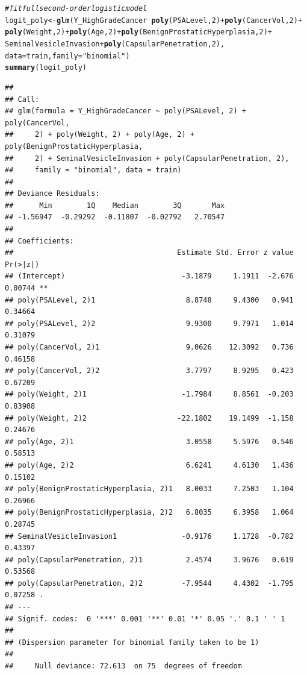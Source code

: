 \documentclass{article}\usepackage[]{graphicx}\usepackage[]{color}
\makeatletter
\newcommand{\hlnum}[1]{\textcolor[rgb]{0.686,0.059,0.569}{#1}}%
\newcommand{\hlstr}[1]{\textcolor[rgb]{0.192,0.494,0.8}{#1}}%
\newcommand{\hlcom}[1]{\textcolor[rgb]{0.678,0.584,0.686}{\textit{#1}}}%
\newcommand{\hlopt}[1]{\textcolor[rgb]{0,0,0}{#1}}%
\newcommand{\hlstd}[1]{\textcolor[rgb]{0.345,0.345,0.345}{#1}}%
\newcommand{\hlkwb}[1]{\textcolor[rgb]{0.69,0.353,0.396}{#1}}%
\newcommand{\hlkwc}[1]{\textcolor[rgb]{0.333,0.667,0.333}{#1}}%
\newcommand{\hlkwd}[1]{\textcolor[rgb]{0.737,0.353,0.396}{\textbf{#1}}}%
\newenvironment{kframe}{%
 \def\at@end@of@kframe{}%
 \ifinner\ifhmode%
  \def\at@end@of@kframe{\end{minipage}}%
  \begin{minipage}{\columnwidth}%
 \fi\fi%
 \def\FrameCommand##1{\hskip\@totalleftmargin \hskip-\fboxsep
 \colorbox{shadecolor}{##1}\hskip-\fboxsep
     \hskip-\linewidth \hskip-\@totalleftmargin \hskip\columnwidth}%
 \MakeFramed {\advance\hsize-\width
   \@totalleftmargin\z@ \linewidth\hsize
   \@setminipage}}%
 {\par\unskip\endMakeFramed%
 \at@end@of@kframe}
\newenvironment{knitrout}{}{} %
\makeatother
\begin{document}
\begin{knitrout}
\begin{kframe}
\begin{alltt}
\hlcom{# fit full second-order logistic model}
\hlstd{logit_poly} \hlkwb{<-} \hlkwd{glm}\hlstd{(Y_HighGradeCancer} \hlopt{~} \hlkwd{poly}\hlstd{(PSALevel,} \hlnum{2}\hlstd{)} \hlopt{+} \hlkwd{poly}\hlstd{(CancerVol,} \hlnum{2}\hlstd{)} \hlopt{+}
                    \hlkwd{poly}\hlstd{(Weight,} \hlnum{2}\hlstd{)} \hlopt{+} \hlkwd{poly}\hlstd{(Age,} \hlnum{2}\hlstd{)} \hlopt{+} \hlkwd{poly}\hlstd{(BenignProstaticHyperplasia,} \hlnum{2}\hlstd{)} \hlopt{+}
                    \hlstd{SeminalVesicleInvasion} \hlopt{+} \hlkwd{poly}\hlstd{(CapsularPenetration,} \hlnum{2}\hlstd{),}
                  \hlkwc{data}\hlstd{=train,} \hlkwc{family}\hlstd{=}\hlstr{"binomial"}\hlstd{)}
\hlkwd{summary}\hlstd{(logit_poly)}
\end{alltt}
\begin{verbatim}
## 
## Call:
## glm(formula = Y_HighGradeCancer ~ poly(PSALevel, 2) + poly(CancerVol, 
##     2) + poly(Weight, 2) + poly(Age, 2) + poly(BenignProstaticHyperplasia, 
##     2) + SeminalVesicleInvasion + poly(CapsularPenetration, 2), 
##     family = "binomial", data = train)
## 
## Deviance Residuals: 
##      Min        1Q    Median        3Q       Max  
## -1.56947  -0.29292  -0.11807  -0.02792   2.70547  
## 
## Coefficients:
##                                      Estimate Std. Error z value Pr(>|z|)   
## (Intercept)                           -3.1879     1.1911  -2.676  0.00744 **
## poly(PSALevel, 2)1                     8.8748     9.4300   0.941  0.34664   
## poly(PSALevel, 2)2                     9.9300     9.7971   1.014  0.31079   
## poly(CancerVol, 2)1                    9.0626    12.3092   0.736  0.46158   
## poly(CancerVol, 2)2                    3.7797     8.9295   0.423  0.67209   
## poly(Weight, 2)1                      -1.7984     8.8561  -0.203  0.83908   
## poly(Weight, 2)2                     -22.1802    19.1499  -1.158  0.24676   
## poly(Age, 2)1                          3.0558     5.5976   0.546  0.58513   
## poly(Age, 2)2                          6.6241     4.6130   1.436  0.15102   
## poly(BenignProstaticHyperplasia, 2)1   8.0033     7.2503   1.104  0.26966   
## poly(BenignProstaticHyperplasia, 2)2   6.8035     6.3958   1.064  0.28745   
## SeminalVesicleInvasion1               -0.9176     1.1728  -0.782  0.43397   
## poly(CapsularPenetration, 2)1          2.4574     3.9676   0.619  0.53568   
## poly(CapsularPenetration, 2)2         -7.9544     4.4302  -1.795  0.07258 . 
## ---
## Signif. codes:  0 '***' 0.001 '**' 0.01 '*' 0.05 '.' 0.1 ' ' 1
## 
## (Dispersion parameter for binomial family taken to be 1)
## 
##     Null deviance: 72.613  on 75  degrees of freedom

\end{verbatim}
\end{kframe}
\end{knitrout}
\end{document}
